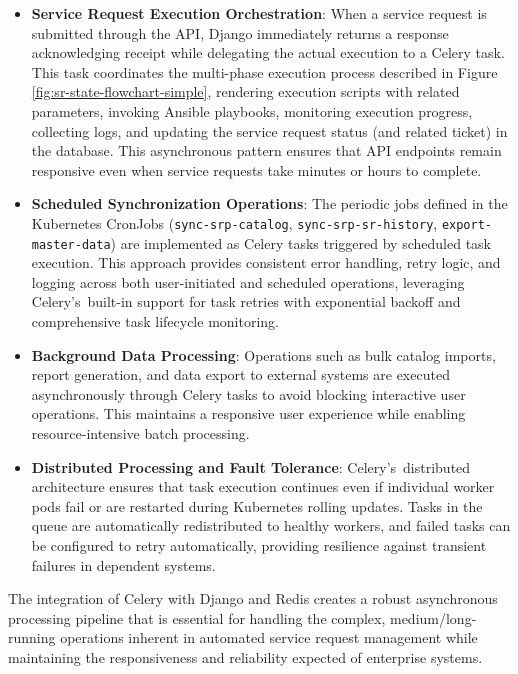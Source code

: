 \begin{itemize}
  \item \textbf{Service Request Execution Orchestration}: When a service request is submitted through the API, Django immediately returns a response acknowledging receipt while delegating the actual execution to a Celery task. This task coordinates the multi-phase execution process described in Figure \ref{fig:sr-state-flowchart-simple}, rendering execution scripts with related parameters, invoking Ansible playbooks,  monitoring execution progress, collecting logs, and updating the service request status (and related ticket) in the database. This asynchronous pattern ensures that API endpoints remain responsive even when service requests take minutes or hours to complete.
  \item \textbf{Scheduled Synchronization Operations}: The periodic jobs defined in the Kubernetes CronJobs (\texttt{sync-srp-catalog}, \texttt{sync-srp-sr-history}, \texttt{export-master-data}) are implemented as Celery tasks triggered by scheduled task execution. This approach provides consistent error handling, retry logic, and logging across both user-initiated and scheduled operations, leveraging Celery's~built-in support for task retries with exponential backoff and comprehensive task lifecycle monitoring.
  \item \textbf{Background Data Processing}: Operations such as bulk catalog imports, report generation, and data export to external systems are executed asynchronously through Celery tasks to avoid blocking interactive user operations. This maintains a responsive user experience while enabling resource-intensive batch processing.
  \item \textbf{Distributed Processing and Fault Tolerance}: Celery's~distributed architecture ensures that task execution continues even if individual worker pods fail or are restarted during Kubernetes rolling updates. Tasks in the queue are automatically redistributed to healthy workers, and failed tasks can be configured to retry automatically, providing resilience against transient failures in dependent systems.
\end{itemize}

The integration of Celery with Django and Redis creates a robust asynchronous processing pipeline that is essential for handling the complex, medium/long-running operations inherent in automated service request management while maintaining the responsiveness and reliability expected of enterprise systems.

